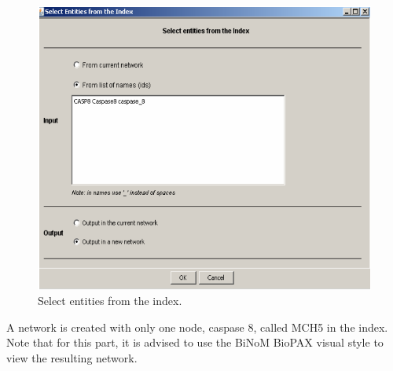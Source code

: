 \begin{figure}[h]
\centering
\includegraphics[width=14 cm]{graphics/Select_entities_from_index}
\caption{Select entities from the index.}
\label{Select_entities_from_index}
\end{figure}
A network is created with only one node, caspase 8, called MCH5 in the index. Note that for this part, it is advised to use the BiNoM BioPAX visual style to view the resulting network.

